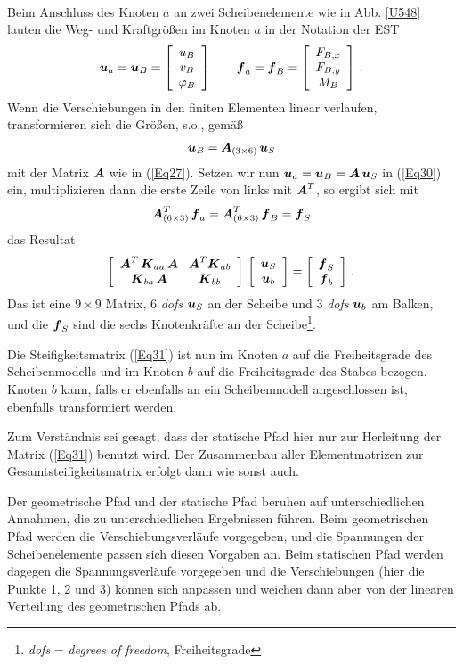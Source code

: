 {\begin{align}
\end{align}
Beim Anschluss des Knoten $a $ an zwei Scheibenelemente wie in Abb. \ref{U548} lauten die Weg- und Kraftgr\"{o}{\ss}en im Knoten $a$ in der Notation der EST
\begin{align}
\vek u_a = \vek u_B =\left[\barr{c} u_B \\ v_B \\ \Np_B\earr \right] \qquad \vek f_a = \vek f_B = \left[\barr{c}  F_{B,x} \\  F_{B,y} \\ M_B\earr \right]\,.
\end{align}
Wenn die Verschiebungen in den finiten Elementen linear verlaufen, transformieren sich die Gr\"{o}{\ss}en, s.o., gem\"{a}{\ss}
\begin{align}
\vek u_B = \vek A_{(3 \times 6)}\,\vek u_S
\end{align}
mit der Matrix $\vek A$ wie in (\ref{Eq27}). Setzen wir nun $\vek u_a = \vek u_B = \vek A\,\vek u_S$ in (\ref{Eq30}) ein, multiplizieren dann die erste Zeile von links mit $\vek A^T$, so ergibt sich mit
\begin{align}
\vek A^T_{(6 \times 3)}\,\vek f_a = \vek A^T_{(6 \times 3)}\,\vek f_B = \vek f_S
\end{align}
das Resultat
\begin{align}\label{Eq31}
\left[\barr{c @{\hspace{3mm}} c } \vek A^T\,\vek K_{aa}\,\vek A & \vek A^T\vek K_{ab} \\
\vek K_{ba}\,\vek A &\vek K_{bb}\earr \right]\,\left[\barr{c} \vek u_S \\ \vek u_b\earr \right] = \left[\barr{c} \vek f_S \\ \vek f_b\earr \right]\,.
\end{align}
Das ist eine $9 \times 9 $ Matrix, 6 {\em dofs\/} $\vek u_S$ an der Scheibe und 3 {\em dofs\/} $\vek u_b$ am Balken, und die $\vek f_S$ sind die sechs Knotenkr\"{a}fte an der Scheibe\footnote{{\em dofs\/} = {\em degrees of freedom\/}, Freiheitsgrade}.

Die Steifigkeitsmatrix (\ref{Eq31}) ist nun im Knoten $a $ auf die Freiheitsgrade des Scheibenmodells und im Knoten $b$ auf die Freiheitsgrade des Stabes bezogen. Knoten $b$ kann, falls er ebenfalls an ein Scheibenmodell angeschlossen ist, ebenfalls transformiert werden.

Zum Verst\"{a}ndnis sei gesagt, dass der statische Pfad hier nur zur Herleitung der Matrix (\ref{Eq31}) benutzt wird. Der  Zusammenbau aller Elementmatrizen zur Gesamtsteifigkeitsmatrix erfolgt dann wie sonst auch.
\begin{remark}
Der geometrische Pfad und der statische Pfad beruhen auf unterschiedlichen Annahmen, die zu unterschiedlichen Ergebnissen f\"{u}hren. Beim geometrischen Pfad werden die Verschiebungsverl\"{a}ufe vorgegeben, und die Spannungen der Scheibenelemente passen sich diesen Vorgaben an. Beim statischen Pfad werden dagegen die Spannungsverl\"{a}ufe vorgegeben und die Verschiebungen (hier die Punkte 1, 2 und 3) k\"{o}nnen sich anpassen und weichen dann aber von der linearen Verteilung des geometrischen Pfads ab.


\end{remark}}

